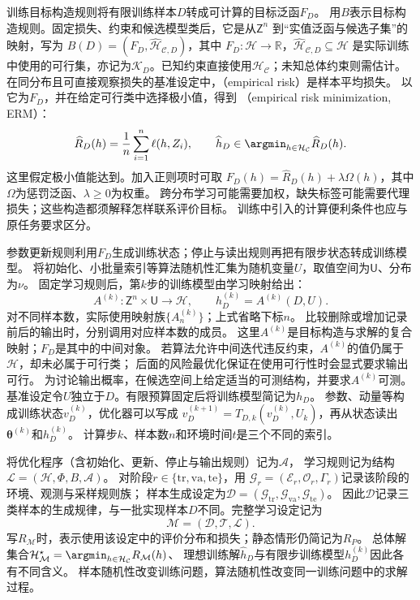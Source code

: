训练目标构造规则将有限训练样本$D$转成可计算的目标泛函$F_D$。
用$B$表示目标构造规则。固定损失、约束和候选模型类后，它是从$\mathsf Z^n$
到“实值泛函与候选子集”的映射，写为
$B(D)=(F_D,\widehat{\mathcal H}_{\mathcal C,D})$，其中
$F_D:\mathcal H\to\mathbb R$，$\widehat{\mathcal H}_{\mathcal C,D}\subseteq\mathcal H$
是实际训练中使用的可行集，亦记为$\mathcal K_D$。已知约束直接使用$\mathcal H_{\mathcal C}$；未知总体约束则需估计。
在同分布且可直接观察损失的基准设定中，（empirical risk）是样本平均损失。
以它为$F_D$，并在给定可行类中选择极小值，得到
（empirical risk minimization, ERM）：
\begin{equation}
  \widehat R_D(h)=\frac1n\sum_{i=1}^n\ell(h,Z_i),\qquad
  \widehat h_D\in\argmin_{h\in\mathcal H_{\mathcal C}}\widehat R_D(h).
  \label{eq:future-unified-empirical-problem}
\end{equation}
这里假定极小值能达到。加入正则项时可取
$F_D(h)=\widehat R_D(h)+\lambda\Omega(h)$，其中$\Omega$为惩罚泛函、$\lambda\geq0$为权重。
跨分布学习可能需要加权，缺失标签可能需要代理损失；这些构造都须解释怎样联系评价目标。
训练中引入的计算便利条件也应与原任务要求区分。

参数更新规则利用$F_D$生成训练状态；停止与读出规则再把有限步状态转成训练模型。
将初始化、小批量索引等算法随机性汇集为随机变量$U$，取值空间为$\mathsf U$、分布为$\nu$。
固定学习规则后，第$k$步的训练模型由学习映射给出：
\begin{equation}
  A^{(k)}:\mathsf Z^n\times\mathsf U\to\mathcal H,
  \qquad h_D^{(k)}=A^{(k)}(D,U).
  \label{eq:future-learning-algorithm-output}
\end{equation}
对不同样本数，实际使用映射族$\{A_n^{(k)}\}$；上式省略下标$n$。
比较删除或增加记录前后的输出时，分别调用对应样本数的成员。
这里$A^{(k)}$是目标构造与求解的复合映射；$F_D$是其中的中间对象。
若算法允许中间迭代违反约束，$A^{(k)}$的值仍属于$\mathcal H$，却未必属于可行类；
后面的风险最优化保证在使用可行性时会显式要求输出可行。
为讨论输出概率，在候选空间上给定适当的可测结构，并要求$A^{(k)}$可测。
基准设定令$U$独立于$D$。有限预算固定后将训练模型简记为$h_D$。
参数、动量等构成训练状态$v_D^{(k)}$，优化器可以写成
$v_D^{(k+1)}=T_{D,k}(v_D^{(k)},U_k)$，再从状态读出$\bm\theta^{(k)}$和$h_D^{(k)}$。
计算步$k$、样本数$n$和环境时间$t$是三个不同的索引。

将优化程序（含初始化、更新、停止与输出规则）记为$\mathscr A$，
学习规则记为结构$\mathcal L=(\mathcal H,\Phi,B,\mathscr A)$。
对阶段$r\in\{\mathrm{tr},\mathrm{va},\mathrm{te}\}$，用
$\mathcal G_r=(\mathcal E_r,\mathcal O_r,\Gamma_r)$记录该阶段的环境、观测与采样规则族；
样本生成设定为$\mathcal D=(\mathcal G_{\mathrm{tr}},\mathcal G_{\mathrm{va}},\mathcal G_{\mathrm{te}})$。
因此$\mathcal D$记录三类样本的生成规律，与一批实现样本$D$不同。完整学习设定记为
\begin{equation}
  \mathcal M=(\mathcal D,\mathcal T,\mathcal L).
  \label{eq:future-unified-learning-problem}
\end{equation}
写$R_{\mathcal M}$时，表示使用该设定中的评价分布和损失；静态情形仍简记为$R_P$。
总体解集合$\mathcal H^\star_{\mathcal M}=\argmin_{h\in\mathcal H_{\mathcal C}}R_{\mathcal M}(h)$、
理想训练解$\widehat h_D$与有限步训练模型$h_D^{(k)}$因此各有不同含义。
样本随机性改变训练问题，算法随机性改变同一训练问题中的求解过程。

